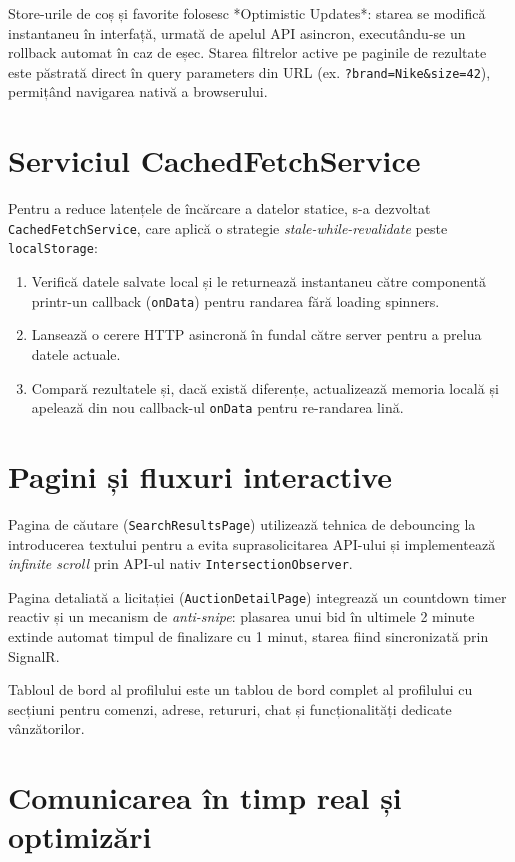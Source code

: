 Store-urile de coș și favorite folosesc *Optimistic Updates*: starea se modifică instantaneu în interfață, urmată de apelul API asincron, executându-se un rollback automat în caz de eșec. Starea filtrelor active pe paginile de rezultate este păstrată direct în query parameters din URL (ex. \texttt{?brand=Nike\&size=42}), permițând navigarea nativă a browserului.

\section{Serviciul CachedFetchService}

Pentru a reduce latențele de încărcare a datelor statice, s-a dezvoltat \texttt{CachedFetchService}, care aplică o strategie \textit{stale-while-revalidate} peste \texttt{localStorage}:
\begin{enumerate}
    \item Verifică datele salvate local și le returnează instantaneu către componentă printr-un callback (\texttt{onData}) pentru randarea fără loading spinners.
    \item Lansează o cerere HTTP asincronă în fundal către server pentru a prelua datele actuale.
    \item Compară rezultatele și, dacă există diferențe, actualizează memoria locală și apelează din nou callback-ul \texttt{onData} pentru re-randarea lină.
\end{enumerate}

\section{Pagini și fluxuri interactive}

Pagina de căutare (\texttt{SearchResultsPage}) utilizează tehnica de debouncing la introducerea textului pentru a evita suprasolicitarea API-ului și implementează \textit{infinite scroll} prin API-ul nativ \texttt{IntersectionObserver}.

Pagina detaliată a licitației (\texttt{AuctionDetailPage}) integrează un countdown timer reactiv și un mecanism de \textit{anti-snipe}: plasarea unui bid în ultimele 2 minute extinde automat timpul de finalizare cu 1 minut, starea fiind sincronizată prin SignalR.

Tabloul de bord al profilului este un tablou de bord complet al profilului cu secțiuni pentru comenzi, adrese, retururi, chat și funcționalități dedicate vânzătorilor.

\section{Comunicarea în timp real și optimizări}

